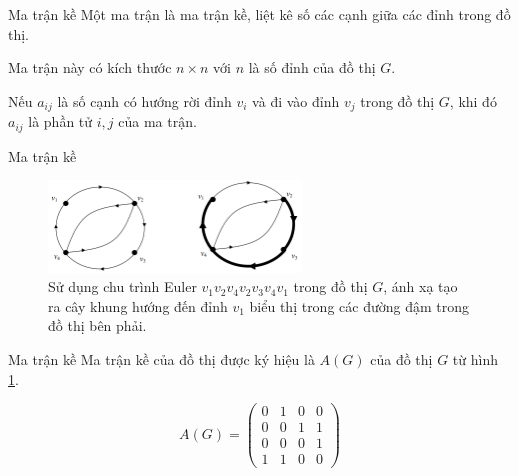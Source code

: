 \documentclass[10pt]{beamer}
\theoremstyle{remark}
\numberwithin{algocf}{section}
\numberwithin{equation}{section}
\numberwithin{dl}{section}
\numberwithin{figure}{section}
\begin{document}
\begin{frame}{Ma trận kề}
    Một ma trận là ma trận kề, liệt kê số các cạnh giữa các đỉnh trong đồ thị.

    Ma trận này có kích thước $n \times n$ với $n$ là số đỉnh của đồ thị $G$.

    Nếu $a_{ij}$ là số cạnh có hướng rời đỉnh $v_i$ và đi vào đỉnh $v_j$ trong đồ thị $G$, khi đó $a_{ij}$ là phần tử $i, j$ của ma trận.

\end{frame}

\begin{frame}{Ma trận kề}
    \begin{figure}[h!]
        \centering
        \includegraphics[width=0.6\textwidth]{4.png}
        \caption{Sử dụng chu trình Euler $v_1 v_2 v_4 v_2 v_3 v_4 v_1$ trong đồ thị $G$, ánh xạ tạo ra cây khung hướng đến đỉnh $v_1$ biểu thị trong các đường đậm trong đồ thị bên phải.}
        \label{fig:4}
    \end{figure}
\end{frame}

\begin{frame}{Ma trận kề}
    Ma trận kề của đồ thị được ký hiệu là $A(G)$ của đồ thị $G$ từ hình \ref{fig:4}.

    \begin{equation*}
        A(G) = \begin{pmatrix}
            0 & 1 & 0 & 0 \\ 
            0 & 0 & 1 & 1 \\ 
            0 & 0 & 0 & 1 \\ 
            1 & 1 & 0 & 0
        \end{pmatrix}
    \end{equation*}
\end{frame}
\end{document}

